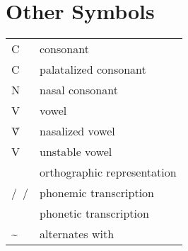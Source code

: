 \section*{Other Symbols}
\begin{longtabu} {YY[2.5]}
	C 		& consonant\\
	C	& palatalized consonant\\
	N 		& nasal consonant\\
	V		& vowel\\
	Ṽ	 	& nasalized vowel\\
	V& unstable vowel\\
	\orth{~}& orthographic representation\\
	/~/		& phonemic transcription\\
	\nt{ }	& phonetic transcription\\
	\sim	& alternates with\\
\end{longtabu}
